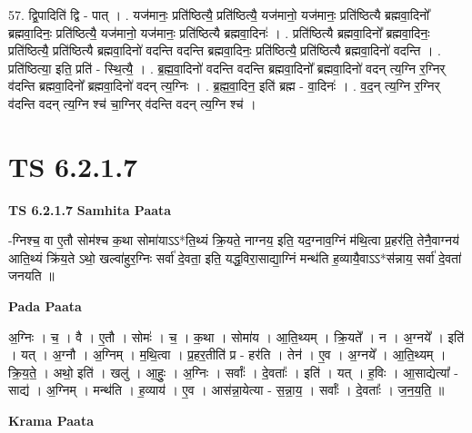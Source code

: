 \documentclass[17pt]{extarticle}
\begin{document}
57. द्वि॒पादिति॑ द्वि - पात् । . यज॑मानः॒ प्रति॑ष्ठित्यै॒ प्रति॑ष्ठित्यै॒ यज॑मानो॒ यज॑मानः॒ प्रति॑ष्ठित्यै ब्रह्मवा॒दिनो᳚ ब्रह्मवा॒दिनः॒ प्रति॑ष्ठित्यै॒ यज॑मानो॒ यज॑मानः॒ प्रति॑ष्ठित्यै ब्रह्मवा॒दिनः॑ । . प्रति॑ष्ठित्यै ब्रह्मवा॒दिनो᳚ ब्रह्मवा॒दिनः॒ प्रति॑ष्ठित्यै॒ प्रति॑ष्ठित्यै ब्रह्मवा॒दिनो॑ वदन्ति वदन्ति ब्रह्मवा॒दिनः॒ प्रति॑ष्ठित्यै॒ प्रति॑ष्ठित्यै ब्रह्मवा॒दिनो॑ वदन्ति । . प्रति॑ष्ठित्या॒ इति॒ प्रति॑ - स्थि॒त्यै॒ । . ब्र॒ह्म॒वा॒दिनो॑ वदन्ति वदन्ति ब्रह्मवा॒दिनो᳚ ब्रह्मवा॒दिनो॑ वदन् त्य॒ग्नि र॒ग्निर् व॑दन्ति ब्रह्मवा॒दिनो᳚ ब्रह्मवा॒दिनो॑ वदन् त्य॒ग्निः । . ब्र॒ह्म॒वा॒दिन॒ इति॑ ब्रह्म - वा॒दिनः॑ । . व॒द॒न् त्य॒ग्नि र॒ग्निर् व॑दन्ति वदन् त्य॒ग्नि श्च॑ चा॒ग्निर् व॑दन्ति वदन् त्य॒ग्नि श्च॑ । \newline
\pagebreak
{}

\section{ TS 6.2.1.7 }

\textbf{TS 6.2.1.7 } \newline
\textbf{Samhita Paata} \newline

-ग्निश्च॒ वा ए॒तौ सोम॑श्च क॒था सोमा॑याऽऽ*ति॒थ्यं क्रि॒यते॒ नाग्नय॒ इति॒ यद॒ग्नाव॒ग्निं म॑थि॒त्वा प्र॒हर॑ति॒ तेनै॒वाग्नय॑ आति॒थ्यं क्रि॑य॒ते ऽथो॒ खल्वा॑हुर॒ग्निः सर्वा॑ दे॒वता॒ इति॒ यद्ध॒विरा॒साद्या॒ग्निं मन्थ॑ति ह॒व्यायै॒वाऽऽ*स॑न्नाय॒ सर्वा॑ दे॒वता॑ जनयति ॥ \newline

\textbf{Pada Paata} \newline

अ॒ग्निः । च॒ । वै । ए॒तौ । सोमः॑ । च॒ । क॒था । सोमा॑य । आ॒ति॒थ्यम् । क्रि॒यते᳚ । न । अ॒ग्नये᳚ । इति॑ । यत् । अ॒ग्नौ । अ॒ग्निम् । म॒थि॒त्वा । प्र॒हर॒तीति॑ प्र - हर॑ति । तेन॑ । ए॒व । अ॒ग्नये᳚ । आ॒ति॒थ्यम् । क्रि॒य॒ते॒ । अथो॒ इति॑ । खलु॑ । आ॒हुः॒ । अ॒ग्निः । सर्वाः᳚ । दे॒वताः᳚ । इति॑ । यत् । ह॒विः । आ॒साद्येत्या᳚ - साद्य॑ । अ॒ग्निम् । मन्थ॑ति । ह॒व्याय॑ । ए॒व । आस॑न्ना॒येत्या - स॒न्ना॒य॒ । सर्वाः᳚ । दे॒वताः᳚ । ज॒न॒य॒ति॒ ॥  \newline


\textbf{Krama Paata} \newline
\end{document}
